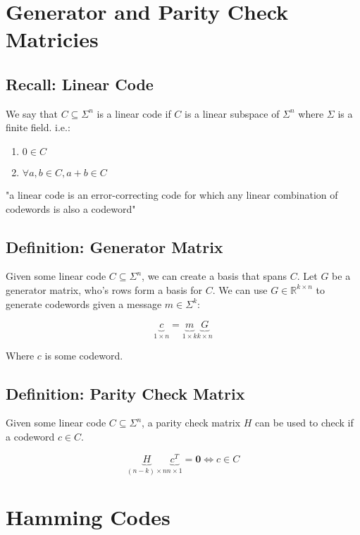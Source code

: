 \documentclass[12pt]{article}
\begin{document}
\section{Generator and Parity Check Matricies}

\subsection{Recall: Linear Code}
We say that $C \subseteq \Sigma^n$ is a linear code if $C$  is a linear subspace of $\Sigma^n$ where $\Sigma$ is a finite field. i.e.:

\begin{enumerate}
  \item $0 \in C$
  \item $\forall a,b \in C, a+b \in C$ 
\end{enumerate}

\begin{center}
  "a linear code is an error-correcting code for which any linear combination of codewords is also a codeword"
\end{center}


\subsection{Definition: Generator Matrix}
Given some linear code $C \subseteq \Sigma^n$, we can create a basis that spans $C$. Let $G$ be a generator matrix, who's rows form a basis for $C$. We can use $G \in \mathbb{R}^{k \times n}$ to generate codewords given a message $m \in \Sigma^k$:


  $$\underbrace{c}_\text{$1 \times n$} = 
  \underbrace{m}_\text{$1 \times k$} \underbrace{G}_\text{$k \times n$} $$


Where $c$ is some codeword.


\subsection{Definition: Parity Check Matrix}
Given some linear code $C \subseteq \Sigma^n$, a parity check matrix $H$ can be used to check if a codeword $c \in C$.

$$ \underbrace{H}_\text{$(n-k) \times n$} \underbrace{c^T}_\text{$n \times 1$}  = \mathbf{0} \iff c \in C  $$

\section{Hamming Codes}
\end{document}
